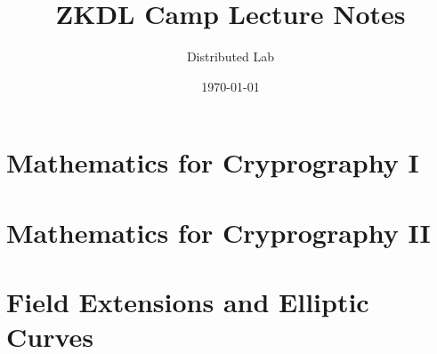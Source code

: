 \documentclass{zkdl-template}
\title{\huge\sffamily\bfseries ZKDL Camp Lecture Notes}
\author{\Large\sffamily Distributed Lab}
\date{\sffamily \today}
\begin{document}
\pagestyle{fancy}

\maketitle

\section{Mathematics for Cryprography I}



\section{Mathematics for Cryprography II}



\section{Field Extensions and Elliptic Curves}


\end{document}
